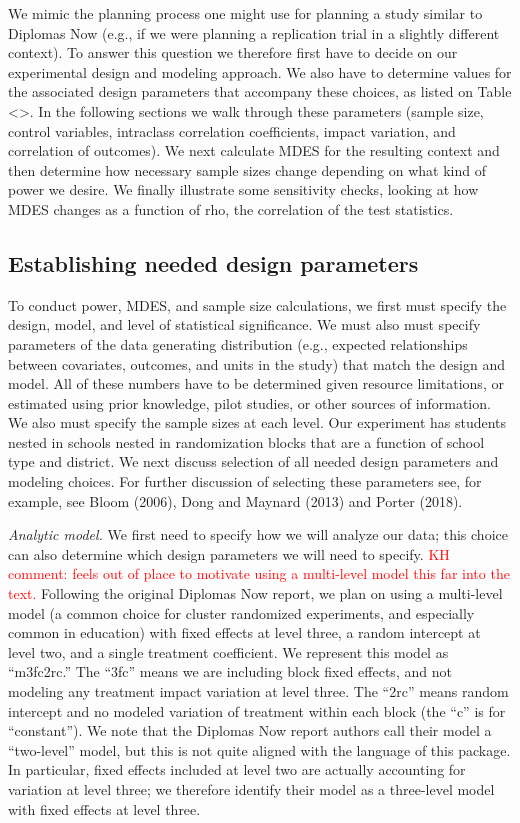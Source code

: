 \documentclass[
]{article}
\begin{document}
We mimic the planning process one might use for planning a study similar
to Diplomas Now (e.g., if we were planning a replication trial in a
slightly different context). To answer this question we therefore first
have to decide on our experimental design and modeling approach. We also
have to determine values for the associated design parameters that
accompany these choices, as listed on Table \textless{}\textgreater. In
the following sections we walk through these parameters (sample size,
control variables, intraclass correlation coefficients, impact
variation, and correlation of outcomes). We next calculate MDES for the
resulting context and then determine how necessary sample sizes change
depending on what kind of power we desire. We finally illustrate some
sensitivity checks, looking at how MDES changes as a function of rho,
the correlation of the test statistics.

\subsection{Establishing needed design parameters}

To conduct power, MDES, and sample size calculations, we first must
specify the design, model, and level of statistical significance. We
must also must specify parameters of the data generating distribution
(e.g., expected relationships between covariates, outcomes, and units in
the study) that match the design and model. All of these numbers have to
be determined given resource limitations, or estimated using prior
knowledge, pilot studies, or other sources of information. We also must
specify the sample sizes at each level. Our experiment has students
nested in schools nested in randomization blocks that are a function of
school type and district. We next discuss selection of all needed design
parameters and modeling choices. For further discussion of selecting
these parameters see, for example, see Bloom (2006), Dong and Maynard
(2013) and Porter (2018).

\emph{Analytic model.} We first need to specify how we will analyze our
data; this choice can also determine which design parameters we will
need to specify.
\textcolor{red}{KH comment: feels out of place to motivate using a multi-level model this far into the text.}
Following the original Diplomas Now report, we plan on using a
multi-level model (a common choice for cluster randomized experiments,
and especially common in education) with fixed effects at level three, a
random intercept at level two, and a single treatment coefficient. We
represent this model as ``m3fc2rc.'' The ``3fc'' means we are including
block fixed effects, and not modeling any treatment impact variation at
level three. The ``2rc'' means random intercept and no modeled variation
of treatment within each block (the ``c'' is for ``constant''). We note
that the Diplomas Now report authors call their model a ``two-level''
model, but this is not quite aligned with the language of this package.
In particular, fixed effects included at level two are actually
accounting for variation at level three; we therefore identify their
model as a three-level model with fixed effects at level three.
\end{document}
